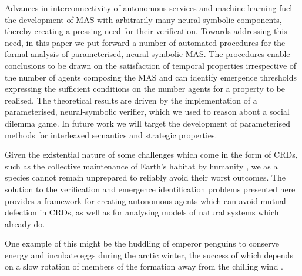 Advances in interconnectivity of autonomous services and machine learning fuel
the development of MAS with arbitrarily many neural-symbolic components,
thereby creating a pressing need for their verification. Towards addressing
this need, in this paper we put forward a number of automated procedures for
the formal analysis of parameterised, neural-symbolic MAS. The procedures
enable conclusions to be drawn on the satisfaction of temporal properties
irrespective of the number of agents composing the MAS and can identify
emergence thresholds expressing the sufficient conditions on the number agents
for a property to be realised. The theoretical results are driven by the
implementation of a parameterised, neural-symbolic verifier, which we used to
reason about a social dilemma game. In future work we will target the
development of parameterised methods for interleaved semantics and strategic properties.


Given the existential nature of some challenges which come in the form of CRDs,
such as the collective maintenance of Earth's habitat by humanity
\cite{Smirnov19}, we as a species cannot remain unprepared to reliably avoid
their worst outcomes. The solution to the verification and
emergence identification problems presented here
provides a framework for creating autonomous agents which can avoid mutual
defection in CRDs, as well as for analysing models of natural systems which
already do.

One example of this might be the huddling of emperor penguins to conserve
energy and incubate eggs \cite{GilbertRLNA06} during the
arctic winter, the success of which depends on a slow rotation of members of
the formation away from the chilling wind \cite{WatersBK12}.

